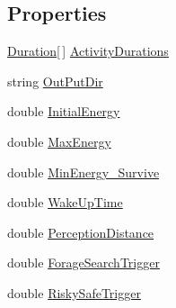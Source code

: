 \subsection*{Properties}
\begin{DoxyCompactItemize}
\item 
\hyperlink{struct_s_e_a_r_c_h_1_1_duration}{Duration}\mbox{[}$\,$\mbox{]} \hyperlink{class_s_e_a_r_c_h_1_1_animal_atributes_afc7aba890c91bb4c436e673bf7116fea}{Activity\-Durations}
\item 
string \hyperlink{class_s_e_a_r_c_h_1_1_animal_atributes_a218579d75b3d4f852b84da4d6d8e26ca}{Out\-Put\-Dir}
\item 
double \hyperlink{class_s_e_a_r_c_h_1_1_animal_atributes_af2f0d37e12632e12d51e6d42e702cc46}{Initial\-Energy}
\item 
double \hyperlink{class_s_e_a_r_c_h_1_1_animal_atributes_aa18e55c7dc93db227993bdf5b02e0f81}{Max\-Energy}
\item 
double \hyperlink{class_s_e_a_r_c_h_1_1_animal_atributes_adb822e897a7275d39c7475f551d29145}{Min\-Energy\-\_\-\-Survive}
\item 
double \hyperlink{class_s_e_a_r_c_h_1_1_animal_atributes_ac891cd39725f29fc85c265c432c1fa3e}{Wake\-Up\-Time}
\item 
double \hyperlink{class_s_e_a_r_c_h_1_1_animal_atributes_a46f40d9ec1c7909a8d9ca2712b260513}{Perception\-Distance}
\item 
double \hyperlink{class_s_e_a_r_c_h_1_1_animal_atributes_a147ee1f1277ac9a820446277e3c73533}{Forage\-Search\-Trigger}
\item 
double \hyperlink{class_s_e_a_r_c_h_1_1_animal_atributes_a179e48f031efc0a8bdbd126fecd75b9f}{Risky\-Safe\-Trigger}
\item 

\end{DoxyCompactItemize}
